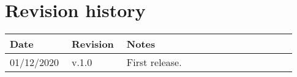 \chapter*{Revision history}

\begin{center}
	\begin{tabular}{@{}p{0.18\linewidth} p{0.18\linewidth} p{0.57\linewidth}@{}}
		\toprule
		\textbf{Date} & \textbf{Revision} & \textbf{Notes}\\
		\midrule
		01/12/2020 & v.1.0 & First release.\\
		\bottomrule
	\end{tabular}
\end{center}